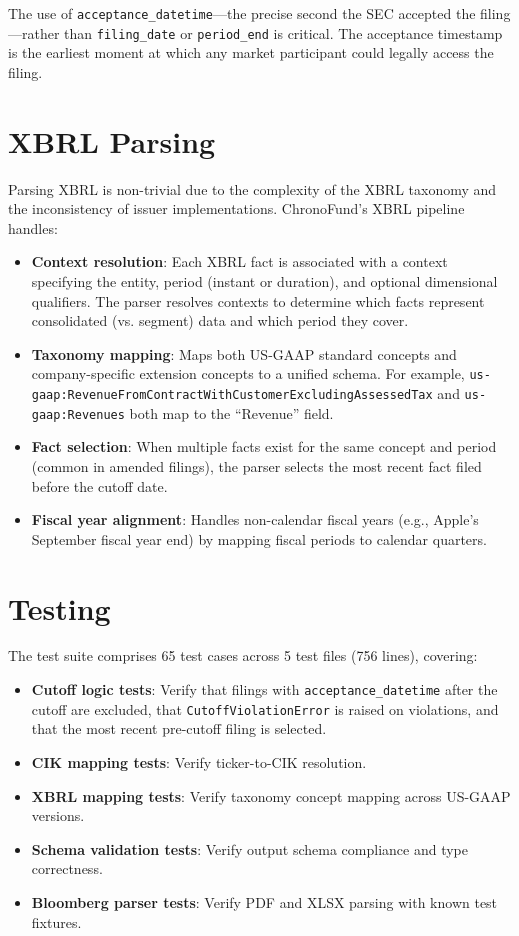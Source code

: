 \documentclass[11pt]{article}
\begin{document}
The use of \texttt{acceptance\_datetime}---the precise second the SEC accepted the filing---rather than \texttt{filing\_date} or \texttt{period\_end} is critical. The acceptance timestamp is the earliest moment at which any market participant could legally access the filing.

\section{XBRL Parsing}

Parsing XBRL is non-trivial due to the complexity of the XBRL taxonomy and the inconsistency of issuer implementations. ChronoFund's XBRL pipeline handles:

\begin{itemize}[nosep]
    \item \textbf{Context resolution}: Each XBRL fact is associated with a context specifying the entity, period (instant or duration), and optional dimensional qualifiers. The parser resolves contexts to determine which facts represent consolidated (vs. segment) data and which period they cover.
    \item \textbf{Taxonomy mapping}: Maps both US-GAAP standard concepts and company-specific extension concepts to a unified schema. For example, \texttt{us-gaap:RevenueFromContractWithCustomerExcludingAssessedTax} and \texttt{us-gaap:Revenues} both map to the ``Revenue'' field.
    \item \textbf{Fact selection}: When multiple facts exist for the same concept and period (common in amended filings), the parser selects the most recent fact filed before the cutoff date.
    \item \textbf{Fiscal year alignment}: Handles non-calendar fiscal years (e.g., Apple's September fiscal year end) by mapping fiscal periods to calendar quarters.
\end{itemize}

\section{Testing}

The test suite comprises 65 test cases across 5 test files (756 lines), covering:

\begin{itemize}[nosep]
    \item \textbf{Cutoff logic tests}: Verify that filings with \texttt{acceptance\_datetime} after the cutoff are excluded, that \texttt{CutoffViolationError} is raised on violations, and that the most recent pre-cutoff filing is selected.
    \item \textbf{CIK mapping tests}: Verify ticker-to-CIK resolution.
    \item \textbf{XBRL mapping tests}: Verify taxonomy concept mapping across US-GAAP versions.
    \item \textbf{Schema validation tests}: Verify output schema compliance and type correctness.
    \item \textbf{Bloomberg parser tests}: Verify PDF and XLSX parsing with known test fixtures.
\end{itemize}
\end{document}
